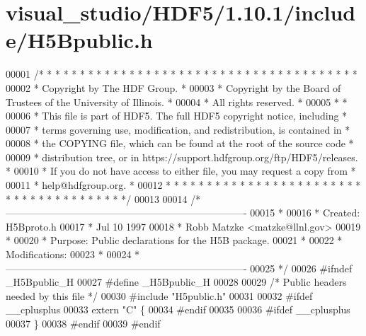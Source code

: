 \hypertarget{visual__studio_2_h_d_f5_21_810_81_2include_2_h5_bpublic_8h_source}{}\section{visual\+\_\+studio/\+H\+D\+F5/1.10.1/include/\+H5\+Bpublic.h}
\label{visual__studio_2_h_d_f5_21_810_81_2include_2_h5_bpublic_8h_source}

\begin{DoxyCode}
00001 \textcolor{comment}{/* * * * * * * * * * * * * * * * * * * * * * * * * * * * * * * * * * * * * * *}
00002 \textcolor{comment}{ * Copyright by The HDF Group.                                               *}
00003 \textcolor{comment}{ * Copyright by the Board of Trustees of the University of Illinois.         *}
00004 \textcolor{comment}{ * All rights reserved.                                                      *}
00005 \textcolor{comment}{ *                                                                           *}
00006 \textcolor{comment}{ * This file is part of HDF5.  The full HDF5 copyright notice, including     *}
00007 \textcolor{comment}{ * terms governing use, modification, and redistribution, is contained in    *}
00008 \textcolor{comment}{ * the COPYING file, which can be found at the root of the source code       *}
00009 \textcolor{comment}{ * distribution tree, or in https://support.hdfgroup.org/ftp/HDF5/releases.  *}
00010 \textcolor{comment}{ * If you do not have access to either file, you may request a copy from     *}
00011 \textcolor{comment}{ * help@hdfgroup.org.                                                        *}
00012 \textcolor{comment}{ * * * * * * * * * * * * * * * * * * * * * * * * * * * * * * * * * * * * * * */}
00013 
00014 \textcolor{comment}{/*-------------------------------------------------------------------------}
00015 \textcolor{comment}{ *}
00016 \textcolor{comment}{ * Created:             H5Bproto.h}
00017 \textcolor{comment}{ *                      Jul 10 1997}
00018 \textcolor{comment}{ *                      Robb Matzke <matzke@llnl.gov>}
00019 \textcolor{comment}{ *}
00020 \textcolor{comment}{ * Purpose:             Public declarations for the H5B package.}
00021 \textcolor{comment}{ *}
00022 \textcolor{comment}{ * Modifications:}
00023 \textcolor{comment}{ *}
00024 \textcolor{comment}{ *-------------------------------------------------------------------------}
00025 \textcolor{comment}{ */}
00026 \textcolor{preprocessor}{#ifndef \_H5Bpublic\_H}
00027 \textcolor{preprocessor}{#define \_H5Bpublic\_H}
00028 
00029 \textcolor{comment}{/* Public headers needed by this file */}
00030 \textcolor{preprocessor}{#include "H5public.h"}
00031 
00032 \textcolor{preprocessor}{#ifdef \_\_cplusplus}
00033 \textcolor{keyword}{extern} \textcolor{stringliteral}{"C"} \{
00034 \textcolor{preprocessor}{#endif}
00035 
00036 \textcolor{preprocessor}{#ifdef \_\_cplusplus}
00037 \}
00038 \textcolor{preprocessor}{#endif}
00039 \textcolor{preprocessor}{#endif}
\end{DoxyCode}
